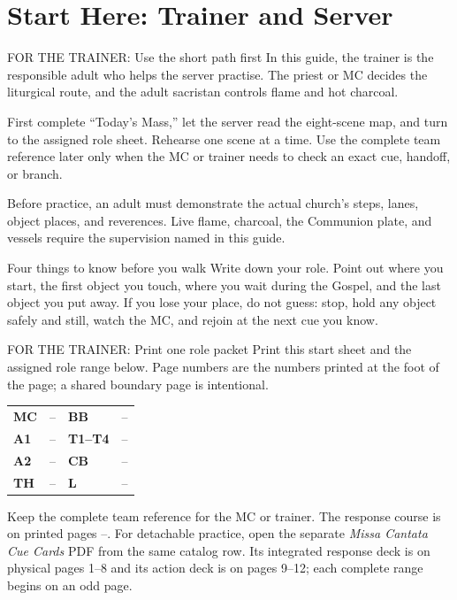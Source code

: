\section{Start Here: Trainer and Server}

\begin{coachbox}{FOR THE TRAINER: Use the short path first}
In this guide, the trainer is the responsible adult who helps the server
practise. The priest or MC decides the liturgical route, and the adult
sacristan controls flame and hot charcoal.

First complete ``Today's Mass,'' let the server read the eight-scene map, and
turn to the assigned role sheet. Rehearse one scene at a time. Use the complete
team reference later only when the MC or trainer needs to check an exact cue,
handoff, or branch.

Before practice, an adult must demonstrate the actual church's steps, lanes,
object places, and reverences. Live flame, charcoal, the Communion plate, and
vessels require the supervision named in this guide.
\end{coachbox}

\begin{learnerbox}{Four things to know before you walk}
Write down your role. Point out where you start, the first object you touch,
where you wait during the Gospel, and the last object you put away. If you lose
your place, do not guess: stop, hold any object safely and still, watch the MC,
and rejoin at the next cue you know.
\end{learnerbox}

\begin{coachbox}{FOR THE TRAINER: Print one role packet}
Print this start sheet and the assigned role range below. Page numbers are the
numbers printed at the foot of the page; a shared boundary page is intentional.

\begin{center}
\small
\begin{tabularx}{\linewidth}{@{}>{\bfseries}l l >{\bfseries}l X@{}}
MC & \pageref{mc-role:mc:first}--\pageref{mc-role:mc:last} &
BB & \pageref{mc-role:bb:first}--\pageref{mc-role:bb:last}\\
A1 & \pageref{mc-role:a1:first}--\pageref{mc-role:a1:last} &
T1--T4 & \pageref{mc-role:t:first}--\pageref{mc-role:t:last}\\
A2 & \pageref{mc-role:a2:first}--\pageref{mc-role:a2:last} &
CB & \pageref{mc-role:cb:first}--\pageref{mc-role:cb:last}\\
TH & \pageref{mc-role:th:first}--\pageref{mc-role:th:last} &
L & \pageref{mc-role:l:first}--\pageref{mc-role:l:last}\\
\end{tabularx}
\end{center}

Keep the complete team reference for the MC or trainer. The response course is
on printed pages \pageref{course:first}--\pageref{course:last}. For detachable
practice, open the separate \emph{Missa Cantata Cue Cards} PDF from the same
catalog row. Its integrated response deck is on physical pages 1--8 and its
action deck is on pages 9--12; each complete range begins on an odd page.
\end{coachbox}

